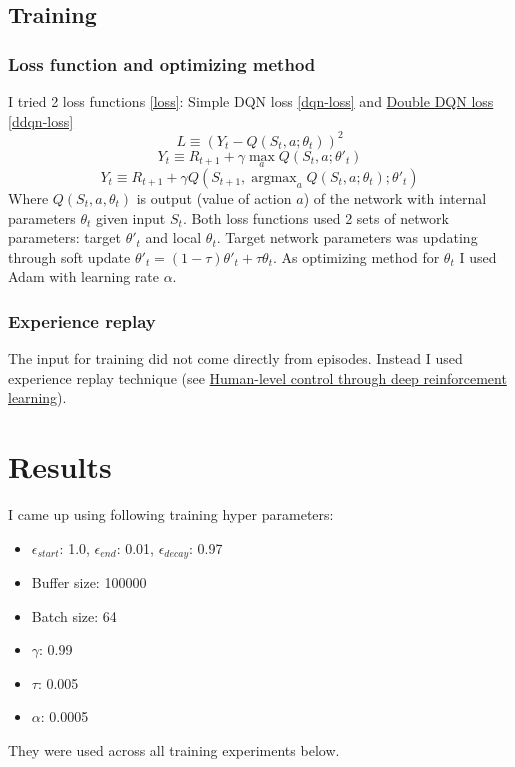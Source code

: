 \documentclass{report}
\DeclareMathOperator*{\argmax}{argmax}
\begin{document}
\subsection*{Training}
\subsubsection*{Loss function and optimizing method}

I tried 2 loss functions \ref{loss}: Simple DQN loss \ref{dqn-loss} and \href{https://arxiv.org/pdf/1509.06461.pdf}{Double DQN loss} \ref{ddqn-loss}
\begin{equation} \label{loss}
L \equiv (Y_{t} - Q(S_{t}, a; \theta_{t}))^{2}
\end{equation}
\begin{equation} \label{dqn-loss}
Y_t \equiv R_{t+1} + \gamma \max_a Q(S_t, a; \theta'_t)
\end{equation}
\begin{equation} \label{ddqn-loss}
Y_t \equiv R_{t+1} + \gamma Q(S_{t+1}, \argmax_a Q(S_t, a; \theta_t); \theta'_t)
\end{equation}
Where \(Q(S_t, a, \theta_t)\) is output (value of action \(a\)) of the network with internal parameters \(\theta_t\) given input \(S_t\). Both loss functions used 2 sets of network parameters: target \(\theta'_t\) and local \(\theta_t\). Target network parameters was updating through soft update \(\theta'_t = (1 - \tau) \theta'_t + \tau \theta_t\).
As optimizing method for \(\theta_t\) I used Adam with learning rate \(\alpha\).

\subsubsection*{Experience replay}

The input for training did not come directly from episodes. Instead I used experience replay technique (see \href{https://storage.googleapis.com/deepmind-media/dqn/DQNNaturePaper.pdf}{Human-level control through deep reinforcement learning}).


\section*{Results}

I came up using following training hyper parameters:
\begin{itemize}
	\item \(\epsilon_{start}\): 1.0, \(\epsilon_{end}\): 0.01, \(\epsilon_{decay}\): 0.97
	\item Buffer size: 100000
	\item Batch size: 64
	\item \(\gamma\): 0.99
	\item \(\tau\): 0.005
	\item \(\alpha\): 0.0005
\end{itemize}
They were used across all training experiments below.
\end{document}
